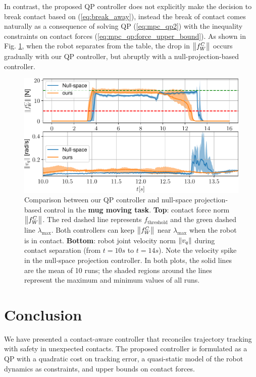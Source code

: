 In contrast, the proposed QP controller does not explicitly make the decision to break contact based on (\ref{eq:break_away}), instead the break of contact comes naturally as a consequence of solving QP (\ref{eq:mpc_qp2}) with the inequality constraints on contact forces (\ref{eq:mpc_qp:force_upper_bound}). As shown in Fig. \ref{fig:jorda_vs_ours}, when the robot separates from the table, the drop in $\left\lVert{f_W^C}\right\rVert$ occurs gradually with our QP controller, but abruptly with a null-projection-based controller.
\begin{figure}[h]
\centering
\includegraphics[width=0.98\linewidth]{figures/04_control/ours_vs_jorda.pdf}
\caption{Comparison between our QP controller and null-space projection-based control in the \textbf{mug moving task}. \textbf{Top}: contact force norm $\left\lVert{f_W^C}\right\rVert$. The red dashed line represents $f_\text{threshold}$ and the green dashed line $\lambda_\text{max}$. Both controllers can keep $\left\lVert{f_W^C}\right\rVert$ near $\lambda_\text{max}$ when the robot is in contact. \textbf{Bottom}: robot joint velocity norm $\left\lVert{v_q}\right\rVert$ during contact separation (from $t=10s$ to $t=14s$). Note the velocity spike in the null-space projection controller. In both plots, the solid lines are the mean of 10 runs; the shaded regions around the lines represent the maximum and minimum values of all runs.}
\label{fig:jorda_vs_ours}
\end{figure}


\section{Conclusion}
We have presented a contact-aware controller that reconciles trajectory tracking with safety in unexpected contacts. The proposed controller is formulated as a QP with a quadratic cost on tracking error, a quasi-static model of the robot dynamics as constraints, and upper bounds on contact forces.


